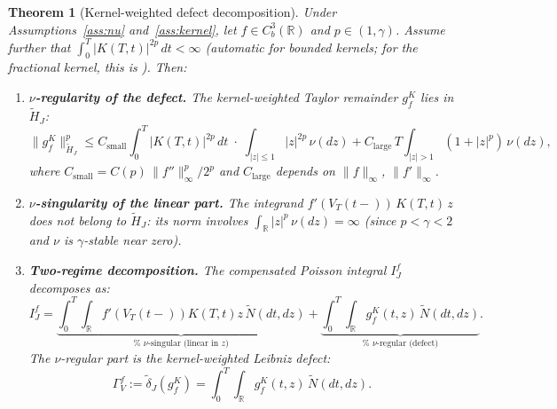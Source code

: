 \documentclass[11pt,a4paper]{article}
\theoremstyle{plain}
\newtheorem{theorem}{Theorem}[section]
\theoremstyle{definition}
\theoremstyle{remark}
\newcommand{\R}{\mathbb{R}}
\newcommand{\Ntilde}{\widetilde{N}}
\begin{document}
\begin{theorem}[Kernel-weighted defect decomposition]
\label{thm:defect-decomposition}
Under Assumptions~\ref{ass:nu} and~\ref{ass:kernel}, let
$f \in C_b^3(\R)$ and $p \in (1,\gamma)$.  Assume further that
$\int_0^T |K(T,t)|^{2p}\,dt < \infty$ (automatic for bounded
kernels; for the fractional kernel, this is ).
Then:
\begin{enumerate}[label=(\alph*)]
\item \textbf{$\nu$-regularity of the defect.}
  The kernel-weighted Taylor remainder $g_f^K$ lies in
  $\widetilde{H}_J$:
  \begin{equation}\label{eq:gfK-bound}
    \|g_f^K\|_{\widetilde{H}_J}^p
    \leq C_{\mathrm{small}}\!\int_0^T\!\!|K(T,t)|^{2p}\,dt
    \;\cdot\;\int_{|z|\leq 1}|z|^{2p}\,\nu(dz)
    + C_{\mathrm{large}}\,T\!\int_{|z|>1}\!(1+|z|^p)\,\nu(dz),
  \end{equation}
  where $C_{\mathrm{small}} = C(p)\,\|f''\|_\infty^p/2^p$
  and $C_{\mathrm{large}}$ depends on $\|f\|_\infty$,
  $\|f'\|_\infty$.

\item \textbf{$\nu$-singularity of the linear part.}
  The integrand $f'(V_T(t\!-\!))\,K(T,t)\,z$ does not belong to
  $\widetilde{H}_J$: its norm involves
  $\int_\R |z|^p\,\nu(dz) = \infty$ (since $p < \gamma < 2$ and
  $\nu$ is $\gamma$-stable near zero).

\item \textbf{Two-regime decomposition.}
  The compensated Poisson integral $I_J^f$ decomposes as:
  \begin{equation}\label{eq:two-regime-VL}
    I_J^f
    = \underbrace{\int_0^T\!\!\int_\R
      f'(V_T(t\!-\!))K(T,t)z\,\Ntilde(dt,dz)}_{\text{%
      $\nu$-singular (linear in $z$)}}
    + \underbrace{\int_0^T\!\!\int_\R
      g_f^K(t,z)\,\Ntilde(dt,dz)}_{\text{%
      $\nu$-regular (defect)}}.
  \end{equation}
  The $\nu$-regular part is the kernel-weighted Leibniz defect:
  \begin{equation}\label{eq:GammaVf}
    \Gamma_V^f := \widetilde{\delta}_J(g_f^K)
    = \int_0^T\!\!\int_\R g_f^K(t,z)\,\Ntilde(dt,dz).
  \end{equation}
\end{enumerate}
\end{theorem}
\end{document}
